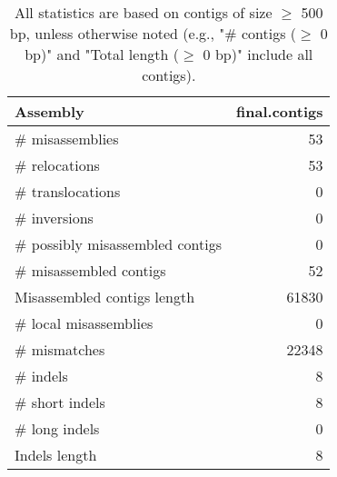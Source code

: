 \documentclass[12pt,a4paper]{article}
\begin{document}
\begin{table}[ht]
\begin{center}
\caption{All statistics are based on contigs of size $\geq$ 500 bp, unless otherwise noted (e.g., "\# contigs ($\geq$ 0 bp)" and "Total length ($\geq$ 0 bp)" include all contigs).}
\begin{tabular}{|l*{1}{|r}|}
\hline
Assembly & final.contigs \\ \hline
\# misassemblies & 53 \\ \hline
\hspace{5mm}\# relocations & 53 \\ \hline
\hspace{5mm}\# translocations & 0 \\ \hline
\hspace{5mm}\# inversions & 0 \\ \hline
\# possibly misassembled contigs & 0 \\ \hline
\# misassembled contigs & 52 \\ \hline
Misassembled contigs length & 61830 \\ \hline
\# local misassemblies & 0 \\ \hline
\# mismatches & 22348 \\ \hline
\# indels & 8 \\ \hline
\hspace{5mm}\# short indels & 8 \\ \hline
\hspace{5mm}\# long indels & 0 \\ \hline
Indels length & 8 \\ \hline
\end{tabular}
\end{center}
\end{table}
\end{document}

